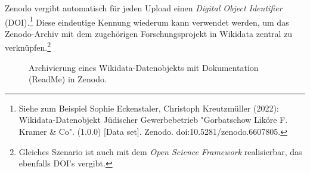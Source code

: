 Zenodo vergibt automatisch für jeden Upload einen \textit{Digital Object Identifier} (DOI).\footnote{Siehe zum Beispiel Sophie Eckenstaler, Christoph Kreutzmüller (2022): Wikidata-Datenobjekt Jüdischer Gewerbebetrieb "Gorbatschow Liköre F. Kramer \& Co". (1.0.0) [Data set]. Zenodo. doi:10.5281/zenodo.6607805.} Diese eindeutige Kennung wiederum kann verwendet werden, um das Zenodo-Archiv mit dem zugehörigen Forschungsprojekt in Wikidata zentral zu verknüpfen.\footnote{Gleiches Szenario ist auch mit dem \textit{Open Science Framework} realisierbar, das ebenfalls DOI's vergibt.}


\begin{figure}[h]
    \centering
    \caption{Archivierung eines Wikidata-Datenobjekts mit Dokumentation (ReadMe) in Zenodo.}
    \label{fig:zenodo}
\end{figure}